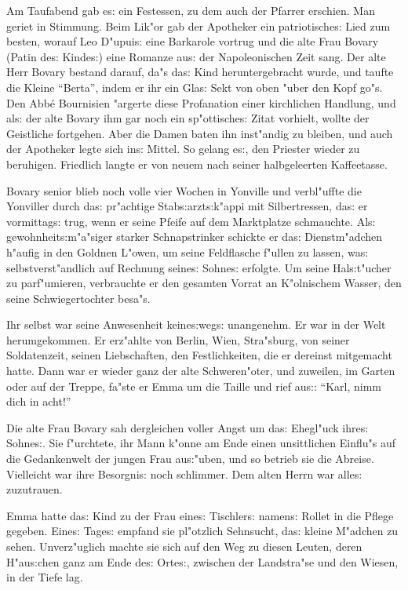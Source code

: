 \documentclass[oneside,12pt]{book}
\newcommand{\s}{s:}%
\begin{document}
Am Taufabend gab e{\s} ein Festessen, zu dem auch der Pfarrer
erschien. Man geriet in Stimmung. Beim Lik"or gab der Apotheker
ein patriotische{\s} Lied zum besten, worauf Leo D"upui{\s} eine
Barkarole vortrug und die alte Frau Bovary (Patin de{\s}
Kinde{\s}) eine Romanze au{\s} der Napoleonischen Zeit sang. Der
alte Herr Bovary bestand darauf, da"s da{\s} Kind heruntergebracht
wurde, und taufte die Kleine "`Berta"', indem er ihr ein Gla{\s}
Sekt von oben "uber den Kopf go"s. Den Abb\'e Bournisien "argerte
diese Profanation einer kirchlichen Handlung, und al{\s} der alte
Bovary ihm gar noch ein sp"ottische{\s} Zitat vorhielt, wollte der
Geistliche fortgehen. Aber die Damen baten ihn inst"andig zu
bleiben, und auch der Apotheker legte sich in{\s} Mittel. So
gelang e{\s}, den Priester wieder zu beruhigen. Friedlich langte
er von neuem nach seiner halbgeleerten Kaffeetasse.

Bovary senior blieb noch volle vier Wochen in Yonville und
verbl"uffte die Yonviller durch da{\s} pr"achtige
Stab{\s}arzt{\s}k"appi mit Silbertressen, da{\s} er vormittag{\s}
trug, wenn er seine Pfeife auf dem Marktplatze schmauchte. Al{\s}
gewohnheit{\s}m"a"siger starker Schnapstrinker schickte er da{\s}
Dienstm"adchen h"aufig in den Goldnen L"owen, um seine Feldflasche
f"ullen zu lassen, wa{\s} selbstverst"andlich auf Rechnung
seine{\s} Sohne{\s} erfolgte. Um seine Hal{\s}t"ucher zu
parf"umieren, verbrauchte er den gesamten Vorrat an K"olnischem
Wasser, den seine Schwiegertochter besa"s.

Ihr selbst war seine Anwesenheit keine{\s}weg{\s} unangenehm. Er
war in der Welt herumgekommen. Er erz"ahlte von Berlin, Wien,
Stra"sburg, von seiner Soldatenzeit, seinen Liebschaften, den
Festlichkeiten, die er dereinst mitgemacht hatte. Dann war er
wieder ganz der alte Schweren"oter, und zuweilen, im Garten oder
auf der Treppe, fa"ste er Emma um die Taille und rief au{\s}:
"`Karl, nimm dich in acht!"'

Die alte Frau Bovary sah dergleichen voller Angst um da{\s}
Ehegl"uck ihre{\s} Sohne{\s}. Sie f"urchtete, ihr Mann k"onne am
Ende einen unsittlichen Einflu"s auf die Gedankenwelt der jungen
Frau au{\s}"uben, und so betrieb sie die Abreise. Vielleicht war
ihre Besorgni{\s} noch schlimmer. Dem alten Herrn war alle{\s}
zuzutrauen.

Emma hatte da{\s} Kind zu der Frau eine{\s} Tischler{\s} namen{\s}
Rollet in die Pflege gegeben. Eine{\s} Tage{\s} empfand sie
pl"otzlich Sehnsucht, da{\s} kleine M"adchen zu sehen.
Unverz"uglich machte sie sich auf den Weg zu diesen Leuten, deren
H"au{\s}chen ganz am Ende de{\s} Orte{\s}, zwischen der
Landstra"se und den Wiesen, in der Tiefe lag.
\end{document}
